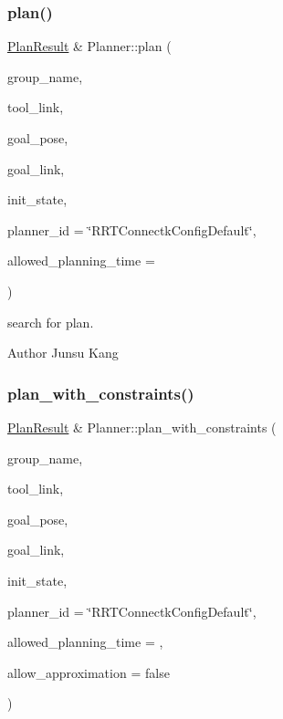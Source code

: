 \subsubsection{\texorpdfstring{plan()}{plan()}}
{\footnotesize\ttfamily \hyperlink{struct_r_n_b_1_1_moveit_compact_1_1_plan_result}{Plan\+Result} \& Planner\+::plan (\begin{DoxyParamCaption}\item[{string}]{group\+\_\+name,  }\item[{string}]{tool\+\_\+link,  }\item[{\hyperlink{class_r_n_b_1_1_moveit_compact_1_1_cart_pose}{Cart\+Pose}}]{goal\+\_\+pose,  }\item[{string}]{goal\+\_\+link,  }\item[{Joint\+State}]{init\+\_\+state,  }\item[{string}]{planner\+\_\+id = {\ttfamily \char`\"{}RRTConnectkConfigDefault\char`\"{}},  }\item[{double}]{allowed\+\_\+planning\+\_\+time = {} }\end{DoxyParamCaption})}



search for plan. 

\begin{DoxyAuthor}{Author}
Junsu Kang 
\end{DoxyAuthor}
\mbox{\label{class_r_n_b_1_1_moveit_compact_1_1_planner_a99f5b838a94452a04b5ea15ad6273026}} 
\subsubsection{\texorpdfstring{plan\+\_\+with\+\_\+constraints()}{plan\_with\_constraints()}}
{\footnotesize\ttfamily \hyperlink{struct_r_n_b_1_1_moveit_compact_1_1_plan_result}{Plan\+Result} \& Planner\+::plan\+\_\+with\+\_\+constraints (\begin{DoxyParamCaption}\item[{string}]{group\+\_\+name,  }\item[{string}]{tool\+\_\+link,  }\item[{\hyperlink{class_r_n_b_1_1_moveit_compact_1_1_cart_pose}{Cart\+Pose}}]{goal\+\_\+pose,  }\item[{string}]{goal\+\_\+link,  }\item[{Joint\+State}]{init\+\_\+state,  }\item[{string}]{planner\+\_\+id = {\ttfamily \char`\"{}RRTConnectkConfigDefault\char`\"{}},  }\item[{double}]{allowed\+\_\+planning\+\_\+time = {},  }\item[{bool}]{allow\+\_\+approximation = {\ttfamily false} }\end{DoxyParamCaption})}



